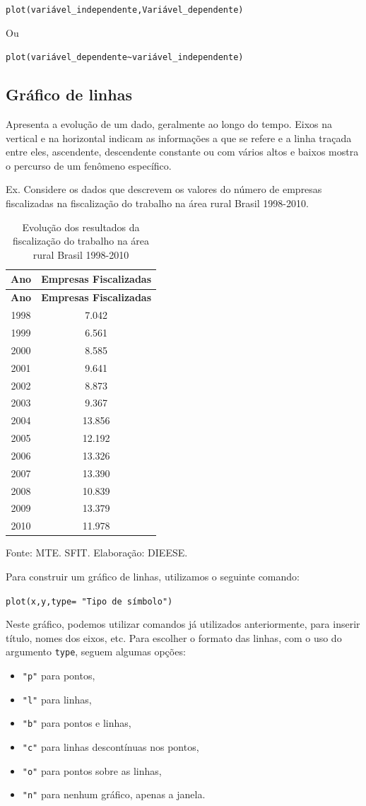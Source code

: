 \documentclass[12pt,brazil,oneside]{book}
\providecommand{\tightlist}{%
  \setlength{\itemsep}{0pt}\setlength{\parskip}{0pt}}
\begin{document}
\texttt{plot(variável\_independente,Variável\_dependente)}

Ou

\texttt{plot(variável\_dependente\textasciitilde{}variável\_independente)}

\hypertarget{grafico-de-linhas}{%
\subsection{Gráfico de linhas}\label{grafico-de-linhas}}

Apresenta a evolução de um dado, geralmente ao longo do tempo. Eixos na
vertical e na horizontal indicam as informações a que se refere e a
linha traçada entre eles, ascendente, descendente constante ou com
vários altos e baixos mostra o percurso de um fenômeno específico.

Ex. Considere os dados que descrevem os valores do número de empresas
fiscalizadas na fiscalização do trabalho na área rural Brasil 1998-2010.

\begin{longtable}[]{@{}cc@{}}
\caption{\label{tab:evolres}Evolução dos resultados da fiscalização do
trabalho na área rural Brasil 1998-2010}\tabularnewline
\toprule
\textbf{Ano} & \textbf{Empresas Fiscalizadas}\tabularnewline
\midrule
\endfirsthead
\toprule
\textbf{Ano} & \textbf{Empresas Fiscalizadas}\tabularnewline
\midrule
\endhead
1998 & 7.042\tabularnewline
1999 & 6.561\tabularnewline
2000 & 8.585\tabularnewline
2001 & 9.641\tabularnewline
2002 & 8.873\tabularnewline
2003 & 9.367\tabularnewline
2004 & 13.856\tabularnewline
2005 & 12.192\tabularnewline
2006 & 13.326\tabularnewline
2007 & 13.390\tabularnewline
2008 & 10.839\tabularnewline
2009 & 13.379\tabularnewline
2010 & 11.978\tabularnewline
\bottomrule
\end{longtable}

Fonte: MTE. SFIT. Elaboração: DIEESE.

Para construir um gráfico de linhas, utilizamos o seguinte comando:

\texttt{plot(x,y,type=\ "Tipo\ de\ símbolo")}

Neste gráfico, podemos utilizar comandos já utilizados anteriormente,
para inserir título, nomes dos eixos, etc. Para escolher o formato das
linhas, com o uso do argumento \texttt{type}, seguem algumas opções:

\begin{itemize}
\tightlist
\item
  \texttt{"p"} para pontos,
\item
  \texttt{"l"} para linhas,
\item
  \texttt{"b"} para pontos e linhas,
\item
  \texttt{"c"} para linhas descontínuas nos pontos,
\item
  \texttt{"o"} para pontos sobre as linhas,
\item
  \texttt{"n"} para nenhum gráfico, apenas a janela.
\end{itemize}
\end{document}
